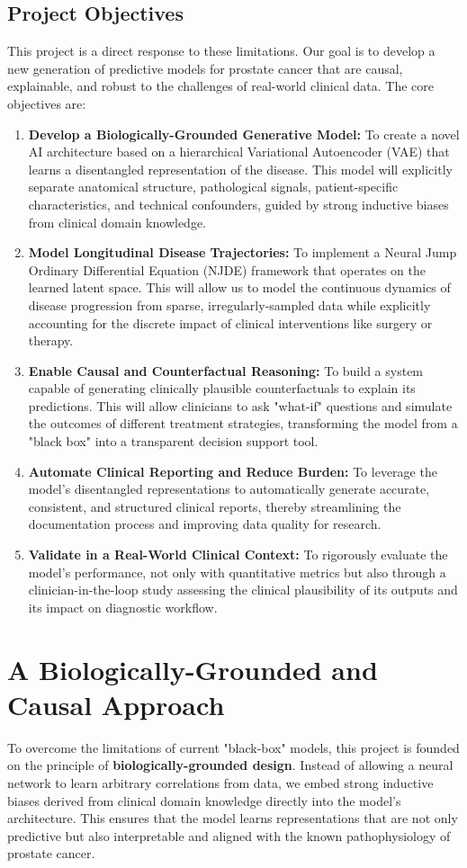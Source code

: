 \documentclass[11pt, a4paper]{article}
\begin{document}
\subsection{Project Objectives}
This project is a direct response to these limitations. Our goal is to develop a new generation of predictive models for prostate cancer that are causal, explainable, and robust to the challenges of real-world clinical data. The core objectives are:
\begin{enumerate}
    \item \textbf{Develop a Biologically-Grounded Generative Model:} To create a novel AI architecture based on a hierarchical Variational Autoencoder (VAE) that learns a disentangled representation of the disease. This model will explicitly separate anatomical structure, pathological signals, patient-specific characteristics, and technical confounders, guided by strong inductive biases from clinical domain knowledge.
    \item \textbf{Model Longitudinal Disease Trajectories:} To implement a Neural Jump Ordinary Differential Equation (NJDE) framework that operates on the learned latent space. This will allow us to model the continuous dynamics of disease progression from sparse, irregularly-sampled data while explicitly accounting for the discrete impact of clinical interventions like surgery or therapy.
    \item \textbf{Enable Causal and Counterfactual Reasoning:} To build a system capable of generating clinically plausible counterfactuals to explain its predictions. This will allow clinicians to ask "what-if" questions and simulate the outcomes of different treatment strategies, transforming the model from a "black box" into a transparent decision support tool.
    \item \textbf{Automate Clinical Reporting and Reduce Burden:} To leverage the model's disentangled representations to automatically generate accurate, consistent, and structured clinical reports, thereby streamlining the documentation process and improving data quality for research.
    \item \textbf{Validate in a Real-World Clinical Context:} To rigorously evaluate the model's performance, not only with quantitative metrics but also through a clinician-in-the-loop study assessing the clinical plausibility of its outputs and its impact on diagnostic workflow.
\end{enumerate}

\section{A Biologically-Grounded and Causal Approach}
To overcome the limitations of current "black-box" models, this project is founded on the principle of \textbf{biologically-grounded design}. Instead of allowing a neural network to learn arbitrary correlations from data, we embed strong inductive biases derived from clinical domain knowledge directly into the model's architecture. This ensures that the model learns representations that are not only predictive but also interpretable and aligned with the known pathophysiology of prostate cancer.
\end{document}
